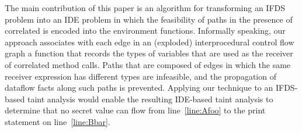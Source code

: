 The main contribution of this paper is an algorithm for transforming an IFDS problem 
into an IDE problem in which the feasibility of paths in the presence of 
correlated is encoded into the environment functions. 
Informally speaking, our approach associates with each edge in an (exploded) 
interprocedural control flow graph a function that records the types of 
variables that are used as the receiver of correlated method calls. Paths that 
are composed of edges in which the same receiver expression has different types
are infeasible, and the propagation of dataflow facts along such paths is
prevented. Applying our technique to an IFDS-based taint analysis would enable
the resulting IDE-based taint analysis to determine that no secret value can flow from
line~\ref{line:Afoo} to the print statement on line~\ref{line:Bbar}. 
 


